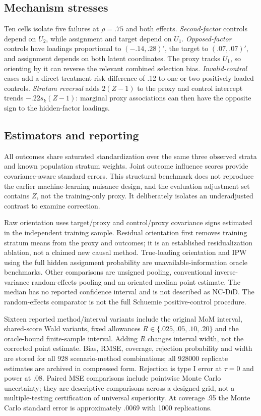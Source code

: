 \documentclass[11pt,a4paper]{article}
\begin{document}
\subsection{Mechanism stresses}

Ten cells isolate five failures at $\rho=.75$ and both effects. \emph{Second-factor} controls depend on $U_2$, while assignment and target depend on $U_1$. \emph{Opposed-factor} controls have loadings proportional to $(-.14,.28)'$, the target to $(.07,.07)'$, and assignment depends on both latent coordinates. The proxy tracks $U_1$, so orienting by it can reverse the relevant combined selection bias. \emph{Invalid-control} cases add a direct treatment risk difference of .12 to one or two positively loaded controls. \emph{Stratum reversal} adds $2(Z-1)$ to the proxy and control intercept trends $-.22s_k(Z-1)$: marginal proxy associations can then have the opposite sign to the hidden-factor loadings.

\subsection{Estimators and reporting}

All outcomes share saturated standardization over the same three observed strata and known population stratum weights. Joint outcome influence scores provide covariance-aware standard errors. This structural benchmark does not reproduce the earlier machine-learning nuisance design, and the evaluation adjustment set contains $Z$, not the training-only proxy. It deliberately isolates an underadjusted contrast to examine correction.

Raw orientation uses target/proxy and control/proxy covariance signs estimated in the independent training sample. Residual orientation first removes training stratum means from the proxy and outcomes; it is an established residualization ablation, not a claimed new causal method. True-loading orientation and IPW using the full hidden assignment probability are unavailable-information oracle benchmarks. Other comparisons are unsigned pooling, conventional inverse-variance random-effects pooling and an oriented median point estimate. The median has no reported confidence interval and is not described as NC-DiD. The random-effects comparator is not the full Schuemie positive-control procedure.

Sixteen reported method/interval variants include the original MoM interval, shared-score Wald variants, fixed allowances $R\in\{.025,.05,.10,.20\}$ and the oracle-bound finite-sample interval. Adding $R$ changes interval width, not the corrected point estimate. Bias, RMSE, coverage, rejection probability and width are stored for all 928 scenario-method combinations; all 928000 replicate estimates are archived in compressed form. Rejection is type I error at $\tau=0$ and power at $.08$. Paired MSE comparisons include pointwise Monte Carlo uncertainty; they are descriptive comparisons across a designed grid, not a multiple-testing certification of universal superiority. At coverage .95 the Monte Carlo standard error is approximately .0069 with 1000 replications.
\end{document}
